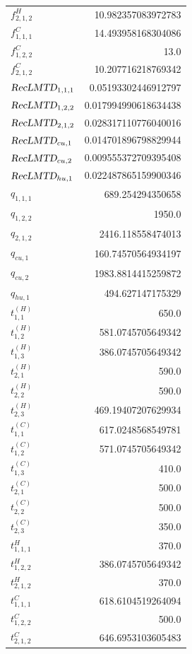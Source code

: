 \documentclass{article}%
\begin{document}
\begin{multicols*}{3}
\begin{supertabular}{lr}
	$f_{2,1,2}^{H}$ & 10.982357083972783 \\%
	$f_{1,1,1}^{C}$ & 14.493958168304086 \\%
	$f_{1,2,2}^{C}$ & 13.0 \\%
	$f_{2,1,2}^{C}$ & 10.207716218769342 \\%
	$\textsl{RecLMTD}_{1,1,1}$ & 0.05193302446912797 \\%
	$\textsl{RecLMTD}_{1,2,2}$ & 0.017994990618634438 \\%
	$\textsl{RecLMTD}_{2,1,2}$ & 0.028317110776040016 \\%
	$\textsl{RecLMTD}_{cu,1}$ & 0.014701896798829944 \\%
	$\textsl{RecLMTD}_{cu,2}$ & 0.009555372709395408 \\%
	$\textsl{RecLMTD}_{hu,1}$ & 0.022487865159900346 \\%
	$q_{1,1,1}$ & 689.254294350658 \\%
	$q_{1,2,2}$ & 1950.0 \\%
	$q_{2,1,2}$ & 2416.118558474013 \\%
	$q_{cu,1}$ & 160.74570564934197 \\%
	$q_{cu,2}$ & 1983.8814415259872 \\%
	$q_{hu,1}$ & 494.627147175329 \\%
	$t_{1,1}^{(H)}$ & 650.0 \\%
	$t_{1,2}^{(H)}$ & 581.0745705649342 \\%
	$t_{1,3}^{(H)}$ & 386.0745705649342 \\%
	$t_{2,1}^{(H)}$ & 590.0 \\%
	$t_{2,2}^{(H)}$ & 590.0 \\%
	$t_{2,3}^{(H)}$ & 469.19407207629934 \\%
	$t_{1,1}^{(C)}$ & 617.0248568549781 \\%
	$t_{1,2}^{(C)}$ & 571.0745705649342 \\%
	$t_{1,3}^{(C)}$ & 410.0 \\%
	$t_{2,1}^{(C)}$ & 500.0 \\%
	$t_{2,2}^{(C)}$ & 500.0 \\%
	$t_{2,3}^{(C)}$ & 350.0 \\%
	$t_{1,1,1}^{H}$ & 370.0 \\%
	$t_{1,2,2}^{H}$ & 386.0745705649342 \\%
	$t_{2,1,2}^{H}$ & 370.0 \\%
	$t_{1,1,1}^{C}$ & 618.6104519264094 \\%
	$t_{1,2,2}^{C}$ & 500.0 \\%
	$t_{2,1,2}^{C}$ & 646.6953103605483 \\%

\end{supertabular}
\end{multicols*}
\end{document}
